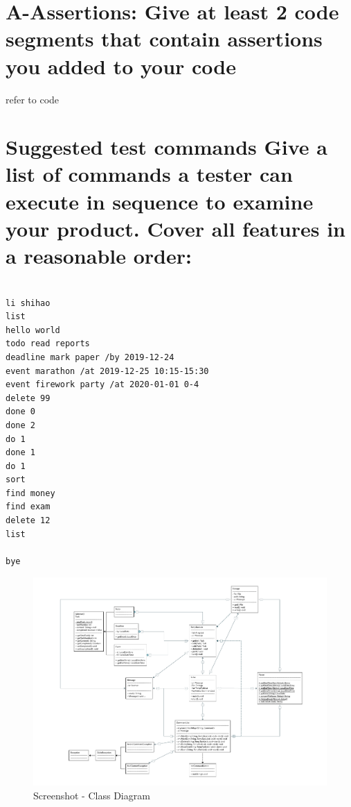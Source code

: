 \documentclass[a4paper,11pt, twoside]{article}
\begin{document}
\begin{table} [htbp]
\section* {A-Assertions: Give at least 2 code segments that contain assertions you added to your code} 
refer to code 

\section* {Suggested test commands Give a list of commands a tester can execute in sequence to examine your product. Cover all features in a reasonable order: } 
\begin{verbatim}

li shihao
list
hello world
todo read reports 
deadline mark paper /by 2019-12-24
event marathon /at 2019-12-25 10:15-15:30
event firework party /at 2020-01-01 0-4
delete 99
done 0
done 2
do 1
done 1
do 1
sort
find money
find exam
delete 12
list

bye
\end{verbatim}

\clearpage 
\begin{landscape}
\appendixpage


\begin{figure}[h]
\centering
\includegraphics[width = 15.6cm]{class.pdf}
\caption{Screenshot - Class Diagram} 
\label{class}
\end{figure} 
\clearpage


\end{landscape}
\end{table}
\end{document}
